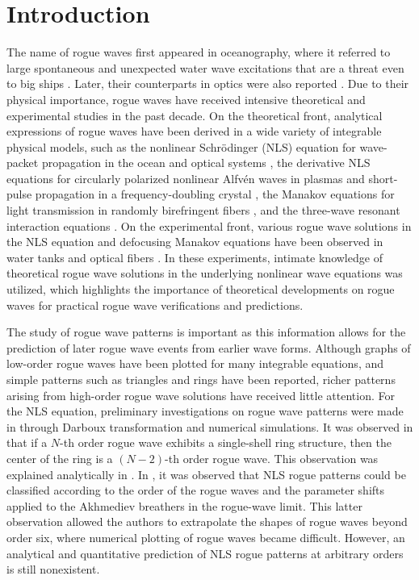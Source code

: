 \documentclass[amsmath,amssymb]{revtex4}
\begin{document}
\section{Introduction}
The name of rogue waves first appeared in oceanography, where it referred to large spontaneous and unexpected water wave excitations that are a threat even to big ships \cite{Ocean_rogue_review,Pelinovsky_book}. Later, their counterparts in optics were also reported \cite{Solli_Nature,Wabnitz_book}. Due to their physical importance, rogue waves have received intensive theoretical and experimental studies in the past decade. On the theoretical front, analytical expressions of rogue waves have been derived in a wide variety of integrable physical models, such as the nonlinear Schr\"{o}dinger (NLS) equation for wave-packet propagation in the ocean and optical systems \cite{Benney,Peregrine,AAS2009,DGKM2010,KAAN2011,GLML2012,OhtaJY2012}, the derivative NLS equations for circularly polarized nonlinear Alfv\'en waves in plasmas and short-pulse propagation in a frequency-doubling crystal
\cite{Kaup_Newell,KN_Alfven1,Wise2007,KN_rogue_2011,KN_rogue_2013,YangDNLS2019}, the Manakov equations for light transmission in randomly birefringent fibers \cite{Menyuk,BDCW2012,ManakovDark,LingGuoZhaoCNLS2014,Chen_Shihua2015,ZhaoGuoLingCNLS2016}, and the three-wave resonant interaction equations \cite{Ablowitz_book,BaroDegas2013,DegasLomba2013,ChenSCrespo2015,WangXChenY2015,ZhangYanWen2018}.
On the experimental front, various rogue wave solutions in the NLS equation and defocusing Manakov equations have been observed in water tanks and optical fibers \cite{Tank1,Tank2,Fiber1,Fiber2,Fiber3}. In these experiments, intimate knowledge of theoretical rogue wave solutions in the underlying nonlinear wave equations was utilized, which highlights the importance of theoretical developments on rogue waves for practical rogue wave verifications and predictions.

The study of rogue wave patterns is important as this information allows for the prediction of later rogue wave events from earlier wave forms. Although graphs of low-order rogue waves have been plotted for many integrable equations, and simple patterns such as triangles and rings have been reported, richer patterns arising from high-order rogue wave solutions have received little attention. For the NLS equation, preliminary investigations on rogue wave patterns were made in \cite{KAAN2011,HeFokas,KAAN2013} through Darboux transformation and numerical simulations. It was observed in \cite{KAAN2011} that if a $N$-th order rogue wave exhibits a single-shell ring structure, then the center of the ring is a $(N-2)$-th order rogue wave. This observation was explained analytically in \cite{HeFokas}. In \cite{KAAN2013}, it was observed that NLS rogue patterns could be classified according to the order of the rogue waves and the parameter shifts applied to the Akhmediev breathers in the rogue-wave limit. This latter observation allowed the authors to extrapolate the shapes of rogue waves beyond order six, where numerical plotting of rogue waves became difficult. However, an analytical and quantitative prediction of NLS rogue patterns at arbitrary orders is still nonexistent.
\end{document}
